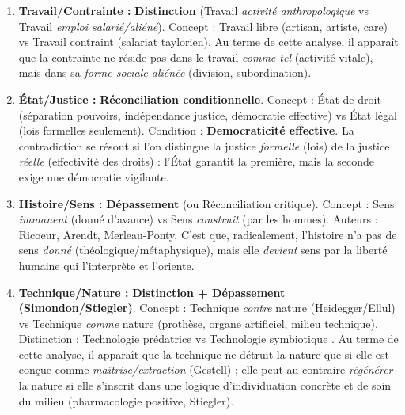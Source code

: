 \documentclass[11pt]{article}
\begin{document}
\begin{corrige}
\begin{enumerate}
    \item \textbf{Travail/Contrainte :} \textbf{Distinction} (Travail \emph{activité anthropologique} vs Travail \emph{emploi salarié/aliéné}). Concept : \og{} Travail libre \fg{} (artisan, artiste, care) vs \og{} Travail contraint \fg{} (salariat taylorien). \og{} Au terme de cette analyse, il apparaît que la contrainte ne réside pas dans le travail \emph{comme tel} (activité vitale), mais dans sa \emph{forme sociale aliénée} (division, subordination). \fg{}
    \item \textbf{État/Justice :} \textbf{Réconciliation conditionnelle}. Concept : \og{} État de droit \fg{} (séparation pouvoirs, indépendance justice, démocratie effective) vs \og{} État légal \fg{} (lois formelles seulement). Condition : \textbf{Democraticité effective}. \og{} La contradiction se résout si l'on distingue la justice \emph{formelle} (lois) de la justice \emph{réelle} (effectivité des droits) : l'État garantit la première, mais la seconde exige une démocratie vigilante. \fg{}
    \item \textbf{Histoire/Sens :} \textbf{Dépassement} (ou Réconciliation critique). Concept : \og{} Sens \emph{immanent} \fg{} (donné d'avance) vs \og{} Sens \emph{construit} \fg{} (par les hommes). Auteurs : Ricoeur, Arendt, Merleau-Ponty. \og{} C'est que, radicalement, l'histoire n'a pas de sens \emph{donné} (théologique/métaphysique), mais elle \emph{devient} sens par la liberté humaine qui l'interprète et l'oriente. \fg{}
    \item \textbf{Technique/Nature :} \textbf{Distinction + Dépassement (Simondon/Stiegler)}. Concept : \og{} Technique \emph{contre} nature \fg{} (Heidegger/Ellul) vs \og{} Technique \emph{comme} nature \fg{} (prothèse, organe artificiel, milieu technique). Distinction : \og{} Technologie prédatrice \fg{} vs \og{} Technologie symbiotique \fg{}. \og{} Au terme de cette analyse, il apparaît que la technique ne détruit la nature que si elle est conçue comme \emph{maîtrise/extraction} (Gestell) ; elle peut au contraire \emph{régénérer} la nature si elle s'inscrit dans une logique d'individuation concrète et de soin du milieu (pharmacologie positive, Stiegler). \fg{}
\end{enumerate}
\end{corrige}
\end{document}
